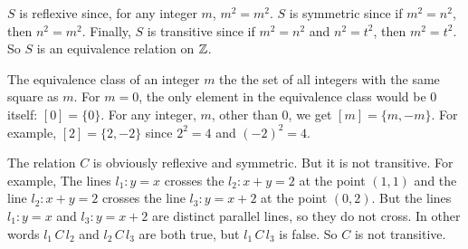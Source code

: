 \begin{Solution}{10.6}
$S$ is reflexive since, for any integer $m$, $m^{2} = m^{2}$. 
$S$ is symmetric since if $m^{2}= n^{2}$, then $n^{2}= m^{2}$. 
Finally, $S$ is transitive since if $m^{2}= n^{2}$ and $n^{2}= t^{2}$, then $m^{2}= t^{2}$.
So $S$ is an equivalence relation on $\mathbb{Z}$.

The equivalence class of an integer $m$ the the set of all integers with the same square as $m$. For $m=0$, the only
element in the equivalence class would be $0$ itself: $[0] = \{0\}$. For any integer, $m$, other than $0$,  we
get $[m] = \{m, -m\}$. For example, $[2] = \{2,-2\}$ since $2^{2} = 4$ and $(-2)^{2} = 4$.
\end{Solution}

\begin{Solution}{10.7}
The relation $C$ is obviously reflexive and symmetric. But it is not transitive. For example, The lines $l_{1}:y=x$ crosses the $l_{2}: x+y = 2$
at the point $(1,1)$ and the line $l_{2}: x+y = 2$ crosses the line $l_{3}: y = x+2$ at the point $(0,2)$. But the lines $l_{1}: y = x$ and
$l_{3}: y = x+2$ are distinct parallel lines, so they do not cross. In other words $l_{1}\, C\, l_{2}$ and  $l_{2}\, C\, l_{3}$  are both true, 
but  $l_{1}\, C\, l_{3}$ is false. So $C$ is not transitive.
\end{Solution}

